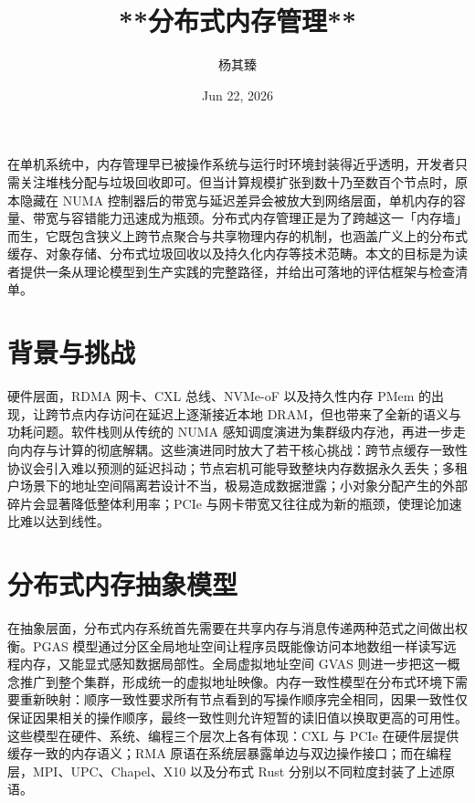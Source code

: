 \title{**分布式内存管理**}
\author{杨其臻}
\date{Jun 22, 2026}
\maketitle
在单机系统中，内存管理早已被操作系统与运行时环境封装得近乎透明，开发者只需关注堆栈分配与垃圾回收即可。但当计算规模扩张到数十乃至数百个节点时，原本隐藏在 NUMA 控制器后的带宽与延迟差异会被放大到网络层面，单机内存的容量、带宽与容错能力迅速成为瓶颈。分布式内存管理正是为了跨越这一「内存墙」而生，它既包含狭义上跨节点聚合与共享物理内存的机制，也涵盖广义上的分布式缓存、对象存储、分布式垃圾回收以及持久化内存等技术范畴。本文的目标是为读者提供一条从理论模型到生产实践的完整路径，并给出可落地的评估框架与检查清单。\par
\chapter{背景与挑战}
硬件层面，RDMA 网卡、CXL 总线、NVMe-oF 以及持久性内存 PMem 的出现，让跨节点内存访问在延迟上逐渐接近本地 DRAM，但也带来了全新的语义与功耗问题。软件栈则从传统的 NUMA 感知调度演进为集群级内存池，再进一步走向内存与计算的彻底解耦。这些演进同时放大了若干核心挑战：跨节点缓存一致性协议会引入难以预测的延迟抖动；节点宕机可能导致整块内存数据永久丢失；多租户场景下的地址空间隔离若设计不当，极易造成数据泄露；小对象分配产生的外部碎片会显著降低整体利用率；PCIe 与网卡带宽又往往成为新的瓶颈，使理论加速比难以达到线性。\par
\chapter{分布式内存抽象模型}
在抽象层面，分布式内存系统首先需要在共享内存与消息传递两种范式之间做出权衡。PGAS 模型通过分区全局地址空间让程序员既能像访问本地数组一样读写远程内存，又能显式感知数据局部性。全局虚拟地址空间 GVAS 则进一步把这一概念推广到整个集群，形成统一的虚拟地址映像。内存一致性模型在分布式环境下需要重新映射：顺序一致性要求所有节点看到的写操作顺序完全相同，因果一致性仅保证因果相关的操作顺序，最终一致性则允许短暂的读旧值以换取更高的可用性。这些模型在硬件、系统、编程三个层次上各有体现：CXL 与 PCIe 在硬件层提供缓存一致的内存语义；RMA 原语在系统层暴露单边与双边操作接口；而在编程层，MPI、UPC、Chapel、X10 以及分布式 Rust 分别以不同粒度封装了上述原语。\par
